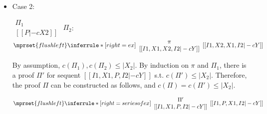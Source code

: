 \begin{itemize}
\item Case 2:
      \begin{center}
        \scriptsize
        \begin{math}
          \begin{array}{c}
            \Pi_1 \\
            {[[P |-c X2]]}
          \end{array}
        \end{math}
        \qquad\qquad
        $\Pi_2$:
        \begin{math}
          $$\mprset{flushleft}
          \inferrule* [right={\tiny ex}] {
            {
              \begin{array}{c}
                \pi \\
                {[[I1, X1, X2, I2 |-c Y]]}
              \end{array}
            }
          }{[[I1, X2, X1, I2 |-c Y]]}
        \end{math}
      \end{center}
      By assumption, $c(\Pi_1),c(\Pi_2)\leq |X_2|$. By induction on $\pi$
      and $\Pi_1$, there is a proof $\Pi'$ for sequent
      $[[I1, X1, P, I2 |-c Y]]$ s.t. $c(\Pi')\leq|X_2|$. Therefore, the
      proof $\Pi$ can be constructed as follows, and
      $c(\Pi)=c(\Pi')\leq|X_2|$.
      \begin{center}
        \scriptsize
        \begin{math}
          $$\mprset{flushleft}
          \inferrule* [right={\tiny series of ex}] {
            {
              \begin{array}{c}
                \Pi' \\
                {[[I1, X1, P, I2 |-c Y]]}
              \end{array}
            }
          }{[[I1, P, X1, I2 |-c Y]]}
        \end{math}
      \end{center}
\end{itemize}

